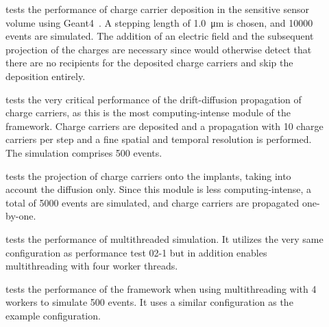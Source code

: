 \begin{description}
    \item[] tests the performance of charge carrier deposition in the sensitive sensor volume using Geant4~\cite{geant4}. A stepping length of \SI{1.0}{\um} is chosen, and \num{10000} events are simulated. The addition of an electric field and the subsequent projection of the charges are necessary since \apsq would otherwise detect that there are no recipients for the deposited charge carriers and skip the deposition entirely.
    \item[] tests the very critical performance of the drift-diffusion propagation of charge carriers, as this is the most computing-intense module of the framework. Charge carriers are deposited and a propagation with 10 charge carriers per step and a fine spatial and temporal resolution is performed. The simulation comprises \num{500} events.
    \item[] tests the projection of charge carriers onto the implants, taking into account the diffusion only. Since this module is less computing-intense, a total of \num{5000} events are simulated, and charge carriers are propagated one-by-one.
    \item[] tests the performance of multithreaded simulation. It utilizes the very same configuration as performance test 02-1 but in addition enables multithreading with four worker threads.
    \item[] tests the performance of the framework when using multithreading with 4 workers to simulate \num{500} events. It uses a similar configuration as the example configuration.
\end{description}
